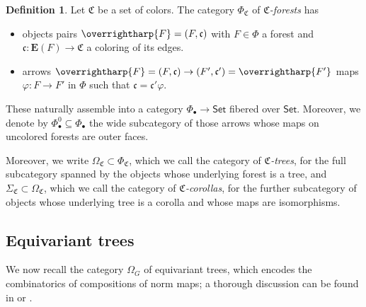\documentclass[a4paper,10pt]{article}%
\numberwithin{equation}{section}
\numberwithin{figure}{section}
\theoremstyle{definition} %
\newtheorem{definition}[equation]{Definition}%
\newcommand{\vect}[1]{\text{\overrightharp{\ensuremath{#1}}}}
\newcommand{\Set}{\ensuremath{\mathsf{Set}}}
\newcommand{\1}{\ensuremath{\mathbbm 1}}%
\begin{document}
\begin{definition}\label{CFOREST_DEF}
      Let $\mathfrak C$ be a set of colors.
      The category $\Phi_{\mathfrak C}$ of \textit{$\mathfrak C$-forests} has
      \begin{itemize}
      \item objects pairs $\vect F = (F, \mathfrak c)$ with
            $F \in \Phi$ a forest and
            $\mathfrak c \colon \boldsymbol{E}(F) \to \mathfrak C$ a coloring of its edges.
      \item arrows $\vect F = (F, \mathfrak c) \to (F', \mathfrak c') = \vect{F'}$ maps
            $\varphi \colon F \to F'$ in $\Phi$ such that $\mathfrak c = \mathfrak c' \varphi$.
      \end{itemize}      

      These naturally assemble into a category $\Phi_\bullet \to \Set$ fibered over $\Set$.
      Moreover, we denote by
      $\Phi_\bullet^0 \subseteq \Phi_\bullet$
      the wide subcategory of those arrows whose maps on uncolored forests are outer faces.
      
      Moreover, we write
      $\Omega_{\mathfrak{C}} \subset \Phi_{\mathfrak{C}}$,
      which we call the category of 
      \emph{$\mathfrak{C}$-trees},
      for the full subcategory spanned by the objects 
      whose underlying forest is a tree,
      and 
      $\Sigma_{\mathfrak{C}} \subset \Omega_{\mathfrak{C}}$,
      which we call the category of 
      \emph{$\mathfrak{C}$-corollas},
      for the further subcategory of objects whose underlying tree is a corolla
      and whose maps are isomorphisms.
\end{definition}




\subsection{Equivariant trees}
\label{GTREES SEC}

We now recall the category $\Omega_G$ of equivariant trees, which encodes the combinatorics of compositions of norm maps;
a thorough discussion can be found in \cite[\S 5]{Per18} or \cite[\S 2]{BP_edss}.
\end{document}
